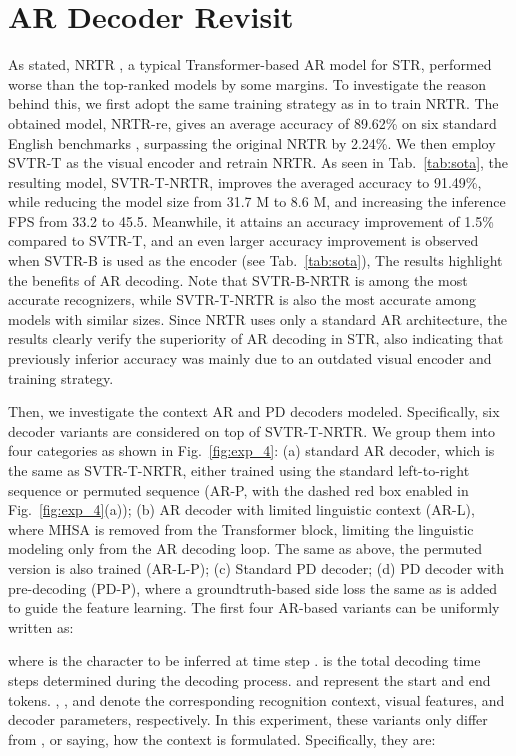 \documentclass[10pt,journal,compsoc]{IEEEtran}
\begin{document}
\section{AR Decoder Revisit}
As stated, NRTR \cite{Sheng2019nrtr}, a typical Transformer-based AR model for STR, performed worse than the top-ranked models by some margins. To investigate the reason behind this, we first adopt the same training strategy as in \cite{fang2021abinet} to train NRTR. The obtained model, NRTR-re, gives an average accuracy of 89.62\% on six standard English benchmarks \cite{whatwrong}, surpassing the original NRTR \cite{Sheng2019nrtr} by 2.24\%. We then employ SVTR-T as the visual encoder and retrain NRTR. As seen in Tab.~\ref{tab:sota}, the resulting model, SVTR-T-NRTR, improves the averaged accuracy to 91.49\%, while reducing the model size from 31.7 M to 8.6 M, and increasing the inference FPS from 33.2 to 45.5. Meanwhile, it attains an accuracy improvement of 1.5\% compared to SVTR-T, and an even larger accuracy improvement is observed when SVTR-B is used as the encoder (see Tab.~\ref{tab:sota}), The results highlight the benefits of AR decoding. Note that SVTR-B-NRTR is among the most accurate recognizers, while SVTR-T-NRTR is also the most accurate among models with similar sizes. Since NRTR uses only a standard AR architecture, the results clearly verify the superiority of AR decoding in STR, also indicating that previously inferior accuracy was mainly due to an outdated visual encoder and training strategy.


Then, we investigate the context AR and PD decoders modeled. Specifically, six decoder variants are considered on top of SVTR-T-NRTR. We group them into four categories as shown in Fig.~\ref{fig:exp_4}: (a) standard AR decoder, which is the same as SVTR-T-NRTR, either trained using the standard left-to-right sequence or permuted sequence \cite{BautistaA22PARSeq} (AR-P, with the dashed red box enabled in Fig.~\ref{fig:exp_4}(a)); (b) AR decoder with limited linguistic context (AR-L), where MHSA is removed from the Transformer block, limiting the linguistic modeling only from the AR decoding loop. The same as above, the permuted version is also trained (AR-L-P); (c) Standard PD decoder; (d) PD decoder with pre-decoding (PD-P), where a groundtruth-based side loss the same as \cite{yu2020srn} is added to guide the feature learning. The first four AR-based variants can be uniformly written as: 




\noindent where  is the character to be inferred at time step .  is the total decoding time steps determined during the decoding process.  and  represent the start and end tokens. , , and  denote the corresponding recognition context, visual features, and decoder parameters, respectively. In this experiment, these variants only differ from , or saying, how the context is formulated. Specifically, they are: 
\end{document}
